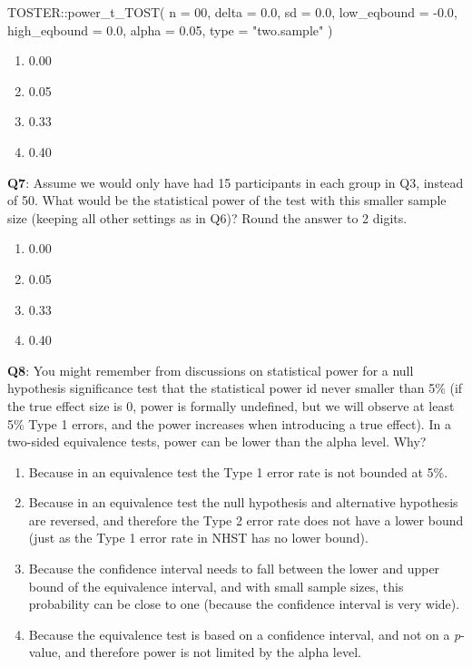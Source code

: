 \documentclass[
  oneside]{book}
\newenvironment{Shaded}{\begin{snugshade}}{\end{snugshade}}
\newcommand{\AttributeTok}[1]{\textcolor[rgb]{0.77,0.63,0.00}{#1}}
\newcommand{\DecValTok}[1]{\textcolor[rgb]{0.00,0.00,0.81}{#1}}
\newcommand{\FloatTok}[1]{\textcolor[rgb]{0.00,0.00,0.81}{#1}}
\newcommand{\FunctionTok}[1]{\textcolor[rgb]{0.00,0.00,0.00}{#1}}
\newcommand{\NormalTok}[1]{#1}
\newcommand{\SpecialCharTok}[1]{\textcolor[rgb]{0.00,0.00,0.00}{#1}}
\newcommand{\StringTok}[1]{\textcolor[rgb]{0.31,0.60,0.02}{#1}}
\providecommand{\tightlist}{%
  \setlength{\itemsep}{0pt}\setlength{\parskip}{0pt}}
\begin{document}
\begin{Shaded}
\begin{Highlighting}[]
\NormalTok{TOSTER}\SpecialCharTok{::}\FunctionTok{power\_t\_TOST}\NormalTok{(}
  \AttributeTok{n =} \DecValTok{00}\NormalTok{,}
  \AttributeTok{delta =} \FloatTok{0.0}\NormalTok{,}
  \AttributeTok{sd =} \FloatTok{0.0}\NormalTok{,}
  \AttributeTok{low\_eqbound =} \SpecialCharTok{{-}}\FloatTok{0.0}\NormalTok{,}
  \AttributeTok{high\_eqbound =} \FloatTok{0.0}\NormalTok{,}
  \AttributeTok{alpha =} \FloatTok{0.05}\NormalTok{,}
  \AttributeTok{type =} \StringTok{"two.sample"}
\NormalTok{)}
\end{Highlighting}
\end{Shaded}

\begin{enumerate}
\def\labelenumi{\Alph{enumi})}
\tightlist
\item
  0.00
\item
  0.05
\item
  0.33
\item
  0.40
\end{enumerate}

\textbf{Q7}: Assume we would only have had 15 participants in each group in Q3, instead of 50. What would be the statistical power of the test with this smaller sample size (keeping all other settings as in Q6)? Round the answer to 2 digits.

\begin{enumerate}
\def\labelenumi{\Alph{enumi})}
\tightlist
\item
  0.00
\item
  0.05
\item
  0.33
\item
  0.40
\end{enumerate}

\textbf{Q8}: You might remember from discussions on statistical power for a null hypothesis significance test that the statistical power id never smaller than 5\% (if the true effect size is 0, power is formally undefined, but we will observe at least 5\% Type 1 errors, and the power increases when introducing a true effect). In a two-sided equivalence tests, power can be lower than the alpha level. Why?

\begin{enumerate}
\def\labelenumi{\Alph{enumi})}
\tightlist
\item
  Because in an equivalence test the Type 1 error rate is not bounded at 5\%.
\item
  Because in an equivalence test the null hypothesis and alternative hypothesis are reversed, and therefore the Type 2 error rate does not have a lower bound (just as the Type 1 error rate in NHST has no lower bound).
\item
  Because the confidence interval needs to fall between the lower and upper bound of the equivalence interval, and with small sample sizes, this probability can be close to one (because the confidence interval is very wide).
\item
  Because the equivalence test is based on a confidence interval, and not on a \emph{p}-value, and therefore power is not limited by the alpha level.
\end{enumerate}
\end{document}
